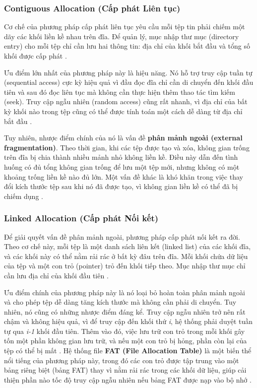 \documentclass[12pt]{article}
\begin{document}
\subsubsection{Contiguous Allocation (Cấp phát Liên tục)}
Cơ chế của phương pháp cấp phát liên tục yêu cầu mỗi tệp tin phải chiếm một dãy các khối liền kề nhau trên đĩa. Để quản lý, mục nhập thư mục (directory entry) cho mỗi tệp chỉ cần lưu hai thông tin: địa chỉ của khối bắt đầu và tổng số khối được cấp phát \parencite{Tanenbaum2014}.

Ưu điểm lớn nhất của phương pháp này là hiệu năng. Nó hỗ trợ truy cập tuần tự (sequential access) cực kỳ hiệu quả vì đầu đọc đĩa chỉ cần di chuyển đến khối đầu tiên và sau đó đọc liên tục mà không cần thực hiện thêm thao tác tìm kiếm (seek). Truy cập ngẫu nhiên (random access) cũng rất nhanh, vì địa chỉ của bất kỳ khối nào trong tệp cũng có thể được tính toán một cách dễ dàng từ địa chỉ bắt đầu \parencite{Fiveable2025}.

Tuy nhiên, nhược điểm chính của nó là vấn đề \textbf{phân mảnh ngoài (external fragmentation)}. Theo thời gian, khi các tệp được tạo và xóa, không gian trống trên đĩa bị chia thành nhiều mảnh nhỏ không liền kề. Điều này dẫn đến tình huống có đủ tổng không gian trống để lưu một tệp mới, nhưng không có một khoảng trống liền kề nào đủ lớn. Một vấn đề khác là khó khăn trong việc thay đổi kích thước tệp sau khi nó đã được tạo, vì không gian liền kề có thể đã bị chiếm dụng \parencite{Silberschatz2018}.

\subsubsection{Linked Allocation (Cấp phát Nối kết)}
Để giải quyết vấn đề phân mảnh ngoài, phương pháp cấp phát nối kết ra đời. Theo cơ chế này, mỗi tệp là một danh sách liên kết (linked list) của các khối đĩa, và các khối này có thể nằm rải rác ở bất kỳ đâu trên đĩa. Mỗi khối chứa dữ liệu của tệp và một con trỏ (pointer) trỏ đến khối tiếp theo. Mục nhập thư mục chỉ cần lưu địa chỉ của khối đầu tiên \parencite{Silberschatz2018}.

Ưu điểm chính của phương pháp này là nó loại bỏ hoàn toàn phân mảnh ngoài và cho phép tệp dễ dàng tăng kích thước mà không cần phải di chuyển. Tuy nhiên, nó cũng có những nhược điểm đáng kể. Truy cập ngẫu nhiên trở nên rất chậm và không hiệu quả, vì để truy cập đến khối thứ \textit{i}, hệ thống phải duyệt tuần tự qua \textit{i-1} khối đầu tiên. Thêm vào đó, việc lưu trữ con trỏ trong mỗi khối gây tốn một phần không gian lưu trữ, và nếu một con trỏ bị hỏng, phần còn lại của tệp có thể bị mất \parencite{Tanenbaum2014}. Hệ thống file \textbf{FAT (File Allocation Table)} là một biến thể nổi tiếng của phương pháp này, trong đó các con trỏ được tập trung vào một bảng riêng biệt (bảng FAT) thay vì nằm rải rác trong các khối dữ liệu, giúp cải thiện phần nào tốc độ truy cập ngẫu nhiên nếu bảng FAT được nạp vào bộ nhớ \parencite{Fiveable2025}.
\end{document}
